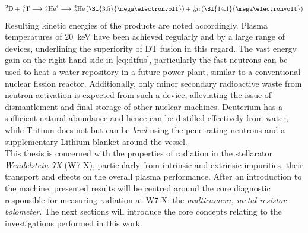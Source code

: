 %
            \begin{align}%
                ^{2}_{1}\text{D}+\,^{3}_{1}\text{T}\longrightarrow\,^{5}_{2}\text{He}^{\ast}\longrightarrow\,^{4}_{2}\text{He}\left(\text{\SI{3.5}{\mega\electronvolt}}\right)+\,^{1}_{0}n\left(\text{\SI{14.1}{\mega\electronvolt}}\right)\label{eq:dtfus}%
            \end{align}%
%
        Resulting kinetic energies of the products are noted accordingly. Plasma temperatures of \SI{20}{\kilo\electronvolt} have been achieved regularly and by a large range of devices, underlining the superiority of DT fusion in this regard. The vast energy gain on the right-hand-side in \cref{eq:dtfus}, particularly the fast neutrons can be used to heat a water repository in a future power plant, similar to a conventional nuclear fission reactor. Additionally, only minor secondary radioactive waste from neutron activation is expected from such a device, alleviating the issue of dismantlement and final storage of other nuclear machines. Deuterium has a sufficient natural abundance and hence can be distilled effectively from water, while Tritium does not but can be \textit{bred} using the penetrating neutrons and a supplementary Lithium blanket around the vessel.\\%
%
        \newline%
        This thesis is concerned with the properties of radiation in the stellarator \textit{Wendelstein-7X} (W7-X), particularly from intrinsic and extrinsic impurities, their transport and effects on the overall plasma performance. After an introduction to the machine, presented results will be centred around the core diagnostic responsible for measuring radiation at W7-X: the \textit{multicamera, metal resistor bolometer}. The next sections will introduce the core concepts relating to the investigations performed in this work.%
%
